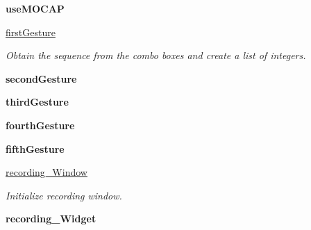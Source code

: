 \begin{DoxyCompactItemize}
\item 
{\bfseries use\+M\+O\+C\+AP}\hypertarget{classGUI__node_1_1MainWindow_a7e22dee015ca394861baaf242f147633}{}\label{classGUI__node_1_1MainWindow_a7e22dee015ca394861baaf242f147633}

\item 
\hyperlink{classGUI__node_1_1MainWindow_a10acb45d98ecf4db16026cee1b4ad0b8}{first\+Gesture}\hypertarget{classGUI__node_1_1MainWindow_a10acb45d98ecf4db16026cee1b4ad0b8}{}\label{classGUI__node_1_1MainWindow_a10acb45d98ecf4db16026cee1b4ad0b8}

\begin{DoxyCompactList}\small\item\em Obtain the sequence from the combo boxes and create a list of integers. \end{DoxyCompactList}\item 
{\bfseries second\+Gesture}\hypertarget{classGUI__node_1_1MainWindow_a5ca8c15840fd88e5dd35e32a325e286c}{}\label{classGUI__node_1_1MainWindow_a5ca8c15840fd88e5dd35e32a325e286c}

\item 
{\bfseries third\+Gesture}\hypertarget{classGUI__node_1_1MainWindow_acf20afbda632cf9a610b271322daf45d}{}\label{classGUI__node_1_1MainWindow_acf20afbda632cf9a610b271322daf45d}

\item 
{\bfseries fourth\+Gesture}\hypertarget{classGUI__node_1_1MainWindow_a95ba659947b940567586c68e90832aec}{}\label{classGUI__node_1_1MainWindow_a95ba659947b940567586c68e90832aec}

\item 
{\bfseries fifth\+Gesture}\hypertarget{classGUI__node_1_1MainWindow_a6f80cfdf1d844675856f1d36c819370a}{}\label{classGUI__node_1_1MainWindow_a6f80cfdf1d844675856f1d36c819370a}

\item 
\hyperlink{classGUI__node_1_1MainWindow_abd186a88da324c4c6e412a47964a439c}{recording\+\_\+\+Window}\hypertarget{classGUI__node_1_1MainWindow_abd186a88da324c4c6e412a47964a439c}{}\label{classGUI__node_1_1MainWindow_abd186a88da324c4c6e412a47964a439c}

\begin{DoxyCompactList}\small\item\em Initialize recording window. \end{DoxyCompactList}\item 
{\bfseries recording\+\_\+\+Widget}\hypertarget{classGUI__node_1_1MainWindow_ac88f9f7f798a977f0819772b95d11110}{}\label{classGUI__node_1_1MainWindow_ac88f9f7f798a977f0819772b95d11110}


\end{DoxyCompactItemize}
